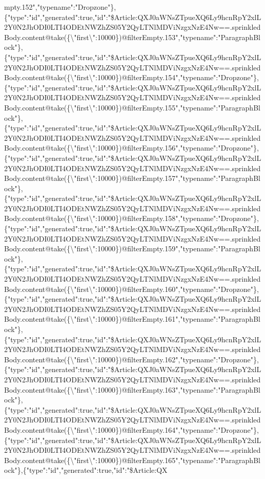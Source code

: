 mpty.152","typename":"Dropzone"\},\{"type":"id","generated":true,"id":"\$Article:QXJ0aWNsZTpueXQ6Ly9hcnRpY2xlL2Y0N2JhODI0LTI4ODEtNWZhZS05Y2QyLTNlMDViNzgxNzE4Nw==.sprinkledBody.content@take(\{\textbackslash{}"first\textbackslash{}":10000\})@filterEmpty.153","typename":"ParagraphBlock"\},\{"type":"id","generated":true,"id":"\$Article:QXJ0aWNsZTpueXQ6Ly9hcnRpY2xlL2Y0N2JhODI0LTI4ODEtNWZhZS05Y2QyLTNlMDViNzgxNzE4Nw==.sprinkledBody.content@take(\{\textbackslash{}"first\textbackslash{}":10000\})@filterEmpty.154","typename":"Dropzone"\},\{"type":"id","generated":true,"id":"\$Article:QXJ0aWNsZTpueXQ6Ly9hcnRpY2xlL2Y0N2JhODI0LTI4ODEtNWZhZS05Y2QyLTNlMDViNzgxNzE4Nw==.sprinkledBody.content@take(\{\textbackslash{}"first\textbackslash{}":10000\})@filterEmpty.155","typename":"ParagraphBlock"\},\{"type":"id","generated":true,"id":"\$Article:QXJ0aWNsZTpueXQ6Ly9hcnRpY2xlL2Y0N2JhODI0LTI4ODEtNWZhZS05Y2QyLTNlMDViNzgxNzE4Nw==.sprinkledBody.content@take(\{\textbackslash{}"first\textbackslash{}":10000\})@filterEmpty.156","typename":"Dropzone"\},\{"type":"id","generated":true,"id":"\$Article:QXJ0aWNsZTpueXQ6Ly9hcnRpY2xlL2Y0N2JhODI0LTI4ODEtNWZhZS05Y2QyLTNlMDViNzgxNzE4Nw==.sprinkledBody.content@take(\{\textbackslash{}"first\textbackslash{}":10000\})@filterEmpty.157","typename":"ParagraphBlock"\},\{"type":"id","generated":true,"id":"\$Article:QXJ0aWNsZTpueXQ6Ly9hcnRpY2xlL2Y0N2JhODI0LTI4ODEtNWZhZS05Y2QyLTNlMDViNzgxNzE4Nw==.sprinkledBody.content@take(\{\textbackslash{}"first\textbackslash{}":10000\})@filterEmpty.158","typename":"Dropzone"\},\{"type":"id","generated":true,"id":"\$Article:QXJ0aWNsZTpueXQ6Ly9hcnRpY2xlL2Y0N2JhODI0LTI4ODEtNWZhZS05Y2QyLTNlMDViNzgxNzE4Nw==.sprinkledBody.content@take(\{\textbackslash{}"first\textbackslash{}":10000\})@filterEmpty.159","typename":"ParagraphBlock"\},\{"type":"id","generated":true,"id":"\$Article:QXJ0aWNsZTpueXQ6Ly9hcnRpY2xlL2Y0N2JhODI0LTI4ODEtNWZhZS05Y2QyLTNlMDViNzgxNzE4Nw==.sprinkledBody.content@take(\{\textbackslash{}"first\textbackslash{}":10000\})@filterEmpty.160","typename":"Dropzone"\},\{"type":"id","generated":true,"id":"\$Article:QXJ0aWNsZTpueXQ6Ly9hcnRpY2xlL2Y0N2JhODI0LTI4ODEtNWZhZS05Y2QyLTNlMDViNzgxNzE4Nw==.sprinkledBody.content@take(\{\textbackslash{}"first\textbackslash{}":10000\})@filterEmpty.161","typename":"ParagraphBlock"\},\{"type":"id","generated":true,"id":"\$Article:QXJ0aWNsZTpueXQ6Ly9hcnRpY2xlL2Y0N2JhODI0LTI4ODEtNWZhZS05Y2QyLTNlMDViNzgxNzE4Nw==.sprinkledBody.content@take(\{\textbackslash{}"first\textbackslash{}":10000\})@filterEmpty.162","typename":"Dropzone"\},\{"type":"id","generated":true,"id":"\$Article:QXJ0aWNsZTpueXQ6Ly9hcnRpY2xlL2Y0N2JhODI0LTI4ODEtNWZhZS05Y2QyLTNlMDViNzgxNzE4Nw==.sprinkledBody.content@take(\{\textbackslash{}"first\textbackslash{}":10000\})@filterEmpty.163","typename":"ParagraphBlock"\},\{"type":"id","generated":true,"id":"\$Article:QXJ0aWNsZTpueXQ6Ly9hcnRpY2xlL2Y0N2JhODI0LTI4ODEtNWZhZS05Y2QyLTNlMDViNzgxNzE4Nw==.sprinkledBody.content@take(\{\textbackslash{}"first\textbackslash{}":10000\})@filterEmpty.164","typename":"Dropzone"\},\{"type":"id","generated":true,"id":"\$Article:QXJ0aWNsZTpueXQ6Ly9hcnRpY2xlL2Y0N2JhODI0LTI4ODEtNWZhZS05Y2QyLTNlMDViNzgxNzE4Nw==.sprinkledBody.content@take(\{\textbackslash{}"first\textbackslash{}":10000\})@filterEmpty.165","typename":"ParagraphBlock"\},\{"type":"id","generated":true,"id":"\$Article:QX